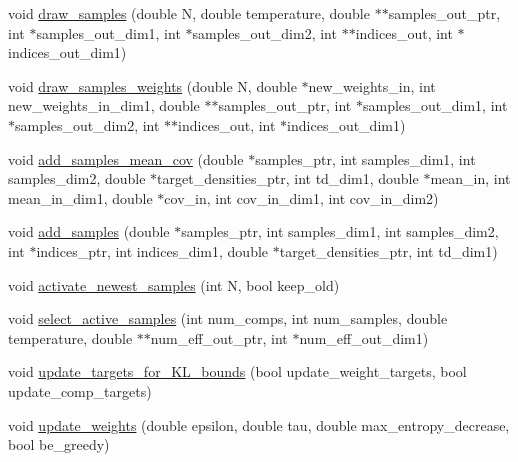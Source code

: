 \begin{DoxyCompactItemize}
\item 
void \hyperlink{classVIPS__PythonWrapper_ac0ae21747614c8e406953e9151578053}{draw\+\_\+samples} (double N, double temperature, double $\ast$$\ast$samples\+\_\+out\+\_\+ptr, int $\ast$samples\+\_\+out\+\_\+dim1, int $\ast$samples\+\_\+out\+\_\+dim2, int $\ast$$\ast$indices\+\_\+out, int $\ast$indices\+\_\+out\+\_\+dim1)
\item 
void \hyperlink{classVIPS__PythonWrapper_adc5d4067954f4164c25426e032b5335d}{draw\+\_\+samples\+\_\+weights} (double N, double $\ast$new\+\_\+weights\+\_\+in, int new\+\_\+weights\+\_\+in\+\_\+dim1, double $\ast$$\ast$samples\+\_\+out\+\_\+ptr, int $\ast$samples\+\_\+out\+\_\+dim1, int $\ast$samples\+\_\+out\+\_\+dim2, int $\ast$$\ast$indices\+\_\+out, int $\ast$indices\+\_\+out\+\_\+dim1)
\item 
void \hyperlink{classVIPS__PythonWrapper_a9c0a069ddf27394166c523834677165a}{add\+\_\+samples\+\_\+mean\+\_\+cov} (double $\ast$samples\+\_\+ptr, int samples\+\_\+dim1, int samples\+\_\+dim2, double $\ast$target\+\_\+densities\+\_\+ptr, int td\+\_\+dim1, double $\ast$mean\+\_\+in, int mean\+\_\+in\+\_\+dim1, double $\ast$cov\+\_\+in, int cov\+\_\+in\+\_\+dim1, int cov\+\_\+in\+\_\+dim2)
\item 
void \hyperlink{classVIPS__PythonWrapper_a5a54eb8d14b32740b286f5f91660b6c2}{add\+\_\+samples} (double $\ast$samples\+\_\+ptr, int samples\+\_\+dim1, int samples\+\_\+dim2, int $\ast$indices\+\_\+ptr, int indices\+\_\+dim1, double $\ast$target\+\_\+densities\+\_\+ptr, int td\+\_\+dim1)
\item 
void \hyperlink{classVIPS__PythonWrapper_a1a2c8975cee0e96085040518a871184c}{activate\+\_\+newest\+\_\+samples} (int N, bool keep\+\_\+old)
\item 
void \hyperlink{classVIPS__PythonWrapper_ad93d42f4b18f28193aaba35129e7c068}{select\+\_\+active\+\_\+samples} (int num\+\_\+comps, int num\+\_\+samples, double temperature, double $\ast$$\ast$num\+\_\+eff\+\_\+out\+\_\+ptr, int $\ast$num\+\_\+eff\+\_\+out\+\_\+dim1)
\item 
void \hyperlink{classVIPS__PythonWrapper_a0e0bab32cbad5c82966440fd5d7e91db}{update\+\_\+targets\+\_\+for\+\_\+\+K\+L\+\_\+bounds} (bool update\+\_\+weight\+\_\+targets, bool update\+\_\+comp\+\_\+targets)
\item 
void \hyperlink{classVIPS__PythonWrapper_a79046b01fe1129abfd723c4d48ca1d45}{update\+\_\+weights} (double epsilon, double tau, double max\+\_\+entropy\+\_\+decrease, bool be\+\_\+greedy)
\item 
$$
\end{DoxyCompactItemize}
